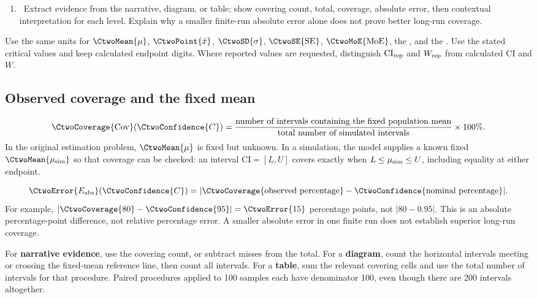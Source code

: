 \begin{enumerate}
    \item \CoverageTask\ Extract evidence from the narrative, diagram, or table; show covering count, total, coverage, absolute error, then contextual interpretation for each level. Explain why a smaller finite-run absolute error alone does not prove better long-run coverage.
\end{enumerate}


Use the same units for $\CtwoMean{\mu}$, $\CtwoPoint{\bar{x}}$, $\CtwoSD{\sigma}$, $\CtwoSE{\mathrm{SE}}$, $\CtwoMoE{\mathrm{MoE}}$, the , and the . Use the stated critical values and keep calculated endpoint digits. Where reported values are requested, distinguish $\mathrm{CI}_{\rm rep}$ and $W_{\rm rep}$ from calculated $\mathrm{CI}$ and $W$.

\subsection{Observed coverage and the fixed mean}
\[
\CtwoCoverage{\mathrm{Cov}}(\CtwoConfidence{C})=
\frac{\text{number of intervals containing the fixed population mean}}
{\text{total number of simulated intervals}}\times100\%.
\]
In the original estimation problem, $\CtwoMean{\mu}$ is fixed but unknown. In a simulation, the model supplies a known fixed $\CtwoMean{\mu_{\rm sim}}$ so that coverage can be checked: an interval $\mathrm{CI}=[L,U]$ covers exactly when $L\leq\mu_{\rm sim}\leq U$, including equality at either endpoint.

\[
\CtwoError{E_{\rm abs}}(\CtwoConfidence{C})
=|\CtwoCoverage{\text{observed percentage}}-\CtwoConfidence{\text{nominal percentage}}|.
\]
For example, $|\CtwoCoverage{80}-\CtwoConfidence{95}|=\CtwoError{15}$ percentage points,
not $|80-0.95|$. This is an absolute percentage-point difference, not relative percentage error.
A smaller absolute error in one finite run does not establish superior long-run coverage.

For \textbf{narrative evidence}, use the covering count, or subtract misses from the total. For a \textbf{diagram}, count the horizontal intervals meeting or crossing the fixed-mean reference line, then count all intervals. For a \textbf{table}, sum the relevant covering cells and use the total number of intervals for that procedure. Paired procedures applied to 100 samples each have denominator 100, even though there are 200 intervals altogether.


